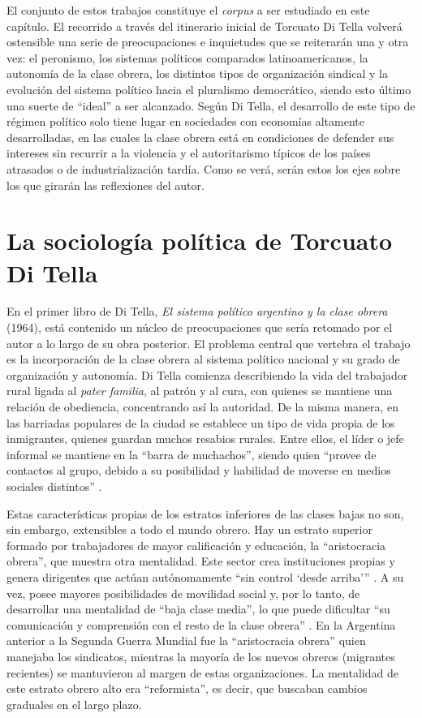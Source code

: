 El conjunto de estos trabajos constituye el \emph{corpus} a ser estudiado en este capítulo. El recorrido a través del itinerario inicial de Torcuato Di Tella volverá ostensible una serie de preocupaciones e inquietudes que se reiterarán una y otra vez: el peronismo, los sistemas políticos comparados latinoamericanos, la autonomía de la clase obrera, los distintos tipos de organización sindical y la evolución del sistema político hacia el pluralismo democrático, siendo esto último una suerte de \enquote{ideal} a ser alcanzado. Según Di Tella, el desarrollo de este tipo de régimen político solo tiene lugar en sociedades con economías altamente desarrolladas, en las cuales la clase obrera está en condiciones de defender sus intereses sin recurrir a la violencia y el autoritarismo típicos de los países atrasados o de industrialización tardía. Como se verá, serán estos los ejes sobre los que girarán las reflexiones del autor.

\section{La sociología política de Torcuato Di Tella}

En el primer libro de Di Tella, \emph{El sistema político argentino y la clase obrera} (1964), está contenido un núcleo de preocupaciones que sería retomado por el autor a lo largo de su obra posterior. El problema central que vertebra el trabajo es la incorporación de la clase obrera al sistema político nacional y su grado de organización y autonomía. Di Tella comienza describiendo la vida del trabajador rural ligada al \emph{pater familia}, al patrón y al cura, con quienes se mantiene una relación de obediencia, concentrando así la autoridad. De la misma manera, en las barriadas populares de la ciudad se establece un tipo de vida propia de los inmigrantes, quienes guardan muchos resabios rurales. Entre ellos, el líder o jefe informal se mantiene en la \enquote{barra de muchachos}, siendo quien \enquote{provee de contactos al grupo, debido a su posibilidad y habilidad de moverse en medios sociales distintos} \parencite[18]{1649-DITELLA1964}.

Estas características propias de los estratos inferiores de las clases bajas no son, sin embargo, extensibles a todo el mundo obrero. Hay un estrato superior formado por trabajadores de mayor calificación y educación, la \enquote{aristocracia obrera}, que muestra otra mentalidad. Este sector crea instituciones propias y genera dirigentes que actúan autónomamente \enquote{sin control \enquote{desde arriba}} \parencite[23]{1649-DITELLA1964}. A su vez, posee mayores posibilidades de movilidad social y, por lo tanto, de desarrollar una mentalidad de \enquote{baja clase media}, lo que puede dificultar \enquote{su comunicación y comprensión con el resto de la clase obrera} \parencite[26]{1649-DITELLA1964}. En la Argentina anterior a la Segunda Guerra Mundial fue la \enquote{aristocracia obrera} quien manejaba los sindicatos, mientras la mayoría de los nuevos obreros (migrantes recientes) se mantuvieron al margen de estas organizaciones. La mentalidad de este estrato obrero alto era \enquote{reformista}, es decir, que buscaban cambios graduales en el largo plazo.

